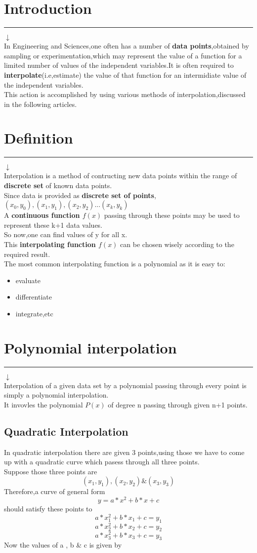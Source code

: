 \documentclass[a4paper, 12pt]{article}
\begin{document}
\section{Introduction}
\hrule
$\downarrow$\\
In Engineering and Sciences,one often has a number of \textbf{data points},obtained by sampling or experimentation,which may represent the value of a function for a limited number of values of the independent variables.It is often required to \textbf{interpolate}(i.e,estimate) the value of that function for an intermidiate value of the independent variables.\\This action is accomplished by using various methods of interpolation,discussed in the following articles.
\section{Definition}\hrule
$\downarrow$\\
Interpolation is a method of contructing new data points within the range of \textbf{discrete set} of known data points.\\Since data is provided as \textbf{discrete set of points},$(x_0,y_0),(x_1,y_1),(x_2,y_2)...(x_k,y_k)$\\
A \textbf{continuous function $f(x)$} passing through these points may be used to represent these k+1 data values.\\
So now,one can find values of y for all x.\\This \textbf{interpolating function $f(x)$} can be chosen wisely according to the required result.\\
The most common interpolating function is a polynomial as it is easy to:
\begin{itemize}
\item evaluate
\item differentiate
\item integrate,etc
\end{itemize}
\newpage
\section{Polynomial interpolation}
\hrule
$\downarrow$\\
Interpolation of a given data set by a polynomial passing through every point is simply a polynomial interpolation.\\It invovles the polynomial $P(x)$ of degree n passing through given n+1 points.
\subsection{Quadratic Interpolation}
In quadratic interpolation there are given 3 points,using those we have to come up with a quadratic curve which pasess through all three points.
\\
 Suppose those three points are  \[(x_1,y_1),(x_2,y_2) \& (x_3,y_3)\] Therefore,a curve of general form \[y=a*x^2+b*x+c\] should satisfy these points to \[a*x_1^2+b*x_1+c=y_1\] \[a*x_2^2+b*x_2+c=y_2\]\[a*x_3^2+b*x_3+c=y_3\] Now the values of a , b \& c is given by
\end{document}
